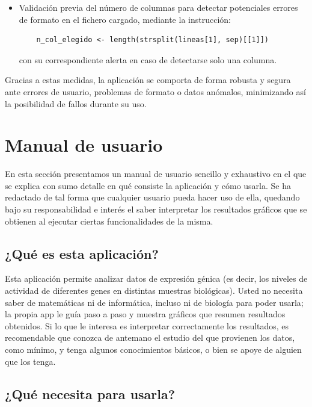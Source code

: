 \begin{itemize}
    \item Validación previa del número de columnas para detectar potenciales errores de formato en el fichero cargado, mediante la instrucción:
    \begin{verbatim}
    n_col_elegido <- length(strsplit(lineas[1], sep)[[1]])
    \end{verbatim}
    con su correspondiente alerta en caso de detectarse solo una columna.
\end{itemize}

Gracias a estas medidas, la aplicación se comporta de forma robusta y segura ante errores de usuario, problemas de formato o datos anómalos, 
minimizando así la posibilidad de fallos durante su uso.

\newpage

\section{Manual de usuario}

En esta sección presentamos un manual de usuario sencillo y exhaustivo en el que se explica con sumo detalle en qué consiste la aplicación 
y cómo usarla. Se ha redactado de tal forma que cualquier usuario pueda hacer uso de ella, quedando bajo su responsabilidad e interés el saber interpretar 
los resultados gráficos que se obtienen al ejecutar ciertas funcionalidades de la misma. \newline

\subsection{¿Qué es esta aplicación?}

Esta aplicación permite analizar datos de expresión génica (es decir, los niveles de actividad de diferentes genes en distintas muestras 
biológicas). Usted no necesita saber de matemáticas ni de informática, incluso ni de biología para poder usarla; la propia app le guía paso a paso y muestra gráficos que resumen 
resultados obtenidos. Si lo que le interesa es interpretar correctamente los resultados, es recomendable que conozca de antemano el estudio del que provienen los datos, 
como mínimo, y tenga algunos
conocimientos básicos, o bien se apoye de alguien que los tenga.

\subsection{¿Qué necesita para usarla?}

